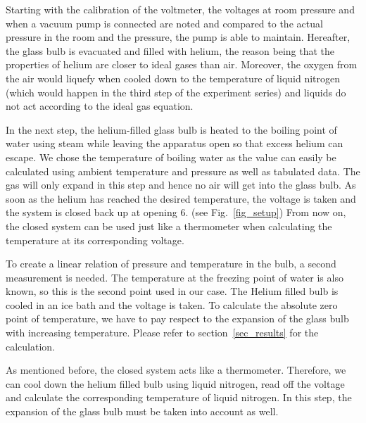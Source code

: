     Starting with the calibration of the voltmeter, the voltages at room pressure and when a vacuum pump is connected are noted and compared to the actual pressure in the room and the pressure, the pump is able to maintain.
    Hereafter, the glass bulb is evacuated and filled with helium, the reason being that the properties of helium are closer to ideal gases than air.
    Moreover, the oxygen from the air would liquefy when cooled down to the temperature of liquid nitrogen (which would happen in the third step of the experiment series) and liquids do not act according to the ideal gas equation.

    In the next step, the helium-filled glass bulb is heated to the boiling point of water using steam while leaving the apparatus open so that excess helium can escape.
    We chose the temperature of boiling water as the value can easily be calculated using ambient temperature and pressure as well as tabulated data.
    The gas will only expand in this step and hence no air will get into the glass bulb.
    As soon as the helium has reached the desired temperature, the voltage is taken and the system is closed back up at opening 6. (see Fig.~\ref{fig_setup})
    From now on, the closed system can be used just like a thermometer when calculating the temperature at its corresponding voltage.
    
    To create a linear relation of pressure and temperature in the bulb, a second measurement is needed.
    The temperature at the freezing point of water is also known, so this is the second point used in our case.
    The Helium filled bulb is cooled in an ice bath and the voltage is taken.
    To calculate the absolute zero point of temperature, we have to pay respect to the expansion of the glass bulb with increasing temperature.
    Please refer to section~\ref{sec_results} for the calculation.

    As mentioned before, the closed system acts like a thermometer.
    Therefore, we can cool down the helium filled bulb using liquid nitrogen, read off the voltage and calculate the corresponding temperature of liquid nitrogen.
    In this step, the expansion of the glass bulb must be taken into account as well.
